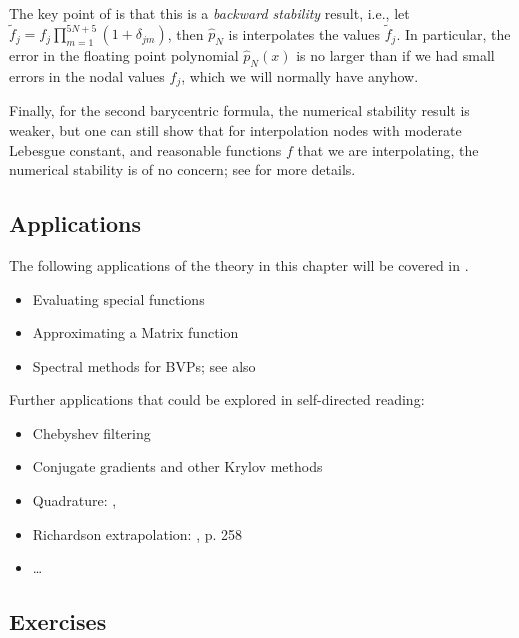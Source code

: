The key point of  is that this is a {\em backward
stability} result, i.e., let $\tilde{f}_j = f_j\prod_{m = 1}^{5N+5}
(1+\delta_{jm})$, then $\hat{p}_N$ is interpolates the values $\tilde{f}_j$. 
In particular, the error in the floating point polynomial $\hat{p}_N(x)$ 
is no larger than if we had small errors in the nodal values $f_j$, which 
we will normally have anyhow. 

Finally, for the second barycentric formula, the numerical stability result is
weaker, but one can still show that for interpolation nodes with moderate
Lebesgue constant, and reasonable functions $f$ that we are interpolating, the
numerical stability is of no concern; see \cite{Higham2004-fn} for more details.



\subsection{Applications}

The following applications of the theory in this chapter will be 
covered in \nbpoly.

\begin{itemize}
   \item Evaluating special functions
   \item Approximating a Matrix function
   \item Spectral methods for BVPs; see also \cite[Sec. 21]{Trefethen2013-rg}
\end{itemize}

\noindent Further applications that could be explored in self-directed reading: 
\begin{itemize}
   \item Chebyshev filtering 
   \item Conjugate gradients and other Krylov methods 
   \item Quadrature: \cite{Trefethen2013-rg}, 
   \item Richardson extrapolation: \cite{Trefethen2013-rg}, p. 258
   \item \dots 
\end{itemize}

\subsection{Exercises}
%


